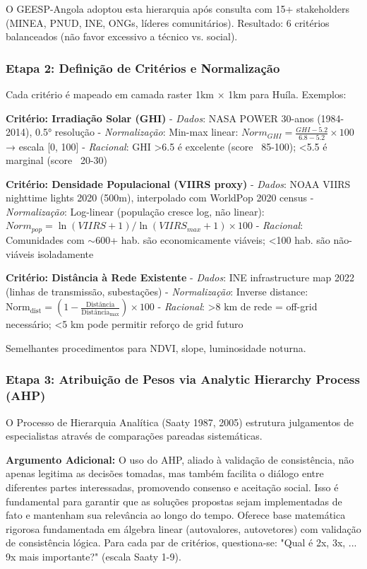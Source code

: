 \documentclass[12pt, a4paper]{article}
\begin{document}
O GEESP-Angola adoptou esta hierarquia após consulta com 15+ stakeholders (MINEA, PNUD, INE, ONGs, líderes comunitários). Resultado: 6 critérios balanceados (não favor excessivo a técnico vs. social).

\subsubsection{Etapa 2: Definição de Critérios e Normalização}

Cada critério é mapeado em camada raster 1km × 1km para Huíla. Exemplos:

\textbf{Critério: Irradiação Solar (GHI)}
- \textit{Dados}: NASA POWER 30-anos (1984-2014), 0.5° resolução
- \textit{Normalização}: Min-max linear: $Norm_{GHI} = \frac{GHI - 5.2}{6.8 - 5.2} \times 100$ → escala [0, 100]
- \textit{Racional}: GHI >6.5 é excelente (score ~85-100); <5.5 é marginal (score ~20-30)

\textbf{Critério: Densidade Populacional (VIIRS proxy)}
- \textit{Dados}: NOAA VIIRS nighttime lights 2020 (500m), interpolado com WorldPop 2020 census
- \textit{Normalização}: Log-linear (população cresce log, não linear): $Norm_{pop} = \ln(VIIRS + 1) / \ln(VIIRS_{max} + 1) \times 100$
- \textit{Racional}: Comunidades com $\sim$600+ hab. são economicamente viáveis; <100 hab. são não-viáveis isoladamente

\textbf{Critério: Distância à Rede Existente}
- \textit{Dados}: INE infrastructure map 2022 (linhas de transmissão, subestações)
- \textit{Normalização}: Inverse distance: $\text{Norm}_{\text{dist}} = (1 - \frac{\text{Distância}}{\text{Distância}_{\text{max}}}) \times 100$
- \textit{Racional}: >8 km de rede = off-grid necessário; <5 km pode permitir reforço de grid futuro

Semelhantes procedimentos para NDVI, slope, luminosidade noturna.

\subsubsection{Etapa 3: Atribuição de Pesos via Analytic Hierarchy Process (AHP)}

O Processo de Hierarquia Analítica (Saaty 1987, 2005) estrutura julgamentos de especialistas através de comparações pareadas sistemáticas.

\textbf{Argumento Adicional:} O uso do AHP, aliado à validação de consistência, não apenas legitima as decisões tomadas, mas também facilita o diálogo entre diferentes partes interessadas, promovendo consenso e aceitação social. Isso é fundamental para garantir que as soluções propostas sejam implementadas de fato e mantenham sua relevância ao longo do tempo.
Oferece base matemática rigorosa fundamentada em álgebra linear (autovalores, autovetores) com validação de consistência lógica.
Para cada par de critérios, questiona-se: "Qual é 2x, 3x, ... 9x mais importante?" (escala Saaty 1-9).
\end{document}
